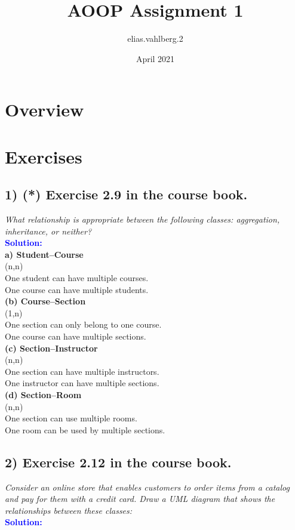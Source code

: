 \documentclass{article}
\title{AOOP Assignment 1 }
\author{elias.vahlberg.2 }
\date{April 2021}
\begin{document}
\maketitle

\section*{Overview}
\section*{Exercises}
\subsection*{1) (*) Exercise 2.9 in the course book.}
\textit{What relationship is appropriate between the following classes: aggregation,
inheritance, or neither?}\\
\indent \textbf{\textcolor{blue}{Solution:}} \\
\textbf{a) Student–Course}\\
\indent (n,n) \\
\indent    One student can have multiple courses.\\
\indent    One course can have multiple students.\\
\textbf{(b) Course–Section}\\
\indent    (1,n)\\
\indent    One section can only belong to one course.\\
\indent    One course can have multiple sections.\\
\textbf{(c) Section–Instructor}\\
\indent    (n,n)\\
\indent    One section can have multiple instructors.\\
\indent    One instructor can have multiple sections.\\
\textbf{(d) Section–Room}\\
\indent    (n,n)\\
\indent    One section can use multiple rooms.\\
\indent    One room can be used by multiple sections.\\
\subsection*{2) Exercise 2.12 in the course book.}
\textit{Consider an online store that enables customers to order items from a catalog and
pay for them with a credit card. Draw a UML diagram that shows the relationships
between these classes:}\\
\indent \textbf{\textcolor{blue}{Solution:}} \\
\end{document}
